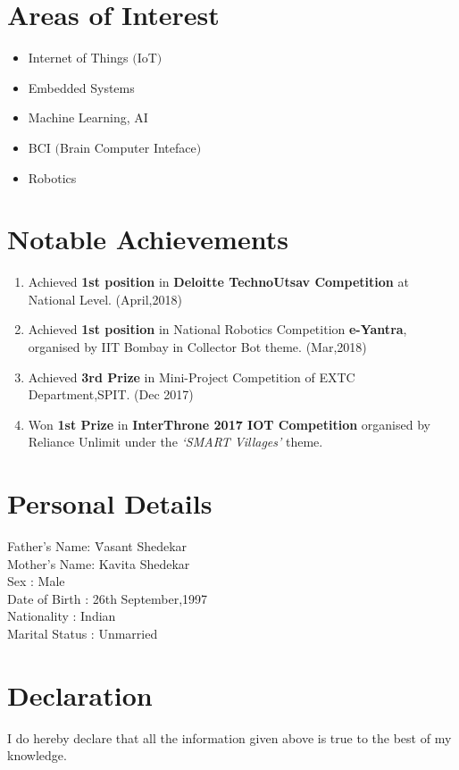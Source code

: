 \documentclass[margin]{res}
\begin{document}
\begin{resume}
\section{Areas of Interest}
\begin{itemize}
\item Internet of Things $($IoT$)$
\item Embedded Systems
\item Machine Learning, AI
\item BCI $($Brain Computer Inteface$)$
\item Robotics
\end{itemize}

\section{Notable Achievements}
\begin{enumerate}
\item Achieved \textbf{1st position} in \textbf{Deloitte TechnoUtsav Competition} at National Level. \hfill   (April,2018)
\item Achieved \textbf{1st position} in National Robotics Competition \textbf{e-Yantra}, organised by IIT Bombay in Collector Bot theme. \hfill   (Mar,2018)
\item Achieved \textbf{3rd Prize} in Mini-Project Competition of EXTC Department,SPIT. \hfill        (Dec 2017)
\item Won \textbf{1st Prize}  in \textbf{InterThrone 2017  IOT Competition} organised by Reliance Unlimit under the \textit{‘SMART Villages’} theme.    


\end{enumerate}

\section{Personal Details}
\begin{tabbing}
Father's Name: \hspace{1em} \= Vasant Shedekar \\
Mother's Name: \>  Kavita Shedekar \\
Sex : \> Male \\
Date of Birth : \>  26th September,1997 \\
Nationality :  \> Indian \\
Marital Status :  \> Unmarried \\
\end{tabbing}

\section{Declaration}
I do hereby declare that all the information given above is true to the best of 
my knowledge.



\end{resume}
\end{document}
